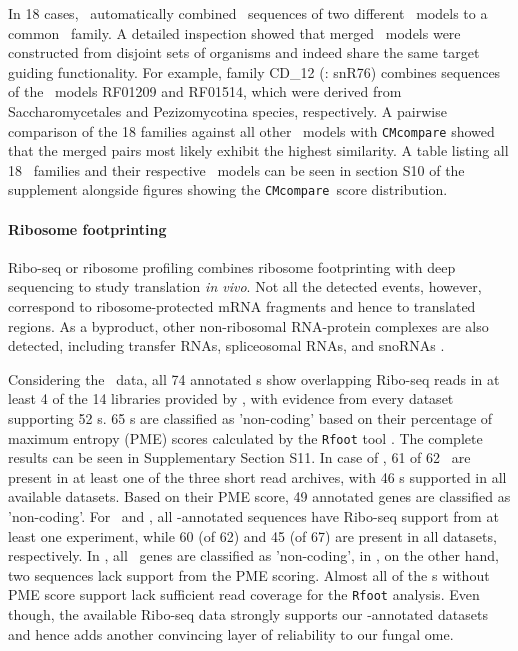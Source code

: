 In 18 cases, \snostrip\ automatically combined \sno\ sequences of two
different \rfam\ models to a common \sno\ family. A detailed inspection
showed that merged \rfam\ models were constructed from disjoint sets of
organisms and indeed share the same target guiding functionality. For
example, family CD\_12 (\sce: snR76) combines sequences of the \rfam\
models RF01209 and RF01514, which were derived from Saccharomycetales and
Pezizomycotina species, respectively. A pairwise comparison of the 18
families against all other \rfam\ models with \texttt{CMcompare}
\cite{Eggenhofer:2013} showed that the merged pairs most likely exhibit the
highest similarity. A table listing all 18 \sno\ families and their
respective \rfam\ models can be seen in section S10 of the supplement
alongside figures showing the \texttt{CMcompare}\ score distribution.  

\paragraph{\textbf{Ribosome footprinting}}
Ribo-seq or ribosome profiling combines ribosome footprinting with deep
sequencing \cite{Ingolia:2009,Ingolia:2012} to study translation \textit{in
  vivo}. Not all the detected events, however, correspond to
ribosome-protected mRNA fragments and hence to translated regions.  As a
byproduct, other non-ribosomal RNA-protein complexes are also detected,
including transfer RNAs, spliceosomal RNAs, and snoRNAs \cite{Ingolia:2014,
  Ji:2016}.

Considering the \sce\ data, all 74 annotated \sno s show overlapping
Ribo-seq reads in at least 4 of the 14 libraries provided by
\cite{Ingolia:2009}, with evidence from every dataset supporting 52 \sno
s. 65 \sno s are classified as 'non-coding' based on their percentage of
maximum entropy (PME) scores calculated by the \texttt{Rfoot} tool
\cite{Ji:2016}. The complete results can be seen in Supplementary Section
S11. In case of \spo, 61 of 62 \sno\ are present in at least one of the
three short read archives, with 46 \sno s supported in all available
datasets. Based on their PME score, 49 annotated genes are classified as
'non-coding'. For \aca\ and \calb , all \snostrip -annotated sequences have
Ribo-seq support from at least one experiment, while 60 (of 62) and 45 (of
67) are present in all datasets, respectively. In \aca, all \sno\ genes are
classified as 'non-coding', in \calb, on the other hand, two sequences lack
support from the PME scoring. Almost all of the \sno s without PME score
support lack sufficient read coverage for the \texttt{Rfoot} analysis.
Even though, the available Ribo-seq data strongly supports our \snostrip
-annotated datasets and hence adds another convincing layer of reliability
to our fungal \sno ome.  

%
%
%

